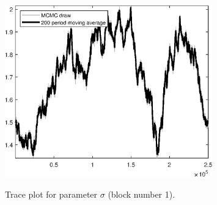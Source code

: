 \begin{figure}[H]
\centering
  \includegraphics[width=0.8\textwidth]{BRS_aggregate/graphs/TracePlot_sigma_blck_1}\\
    \caption{Trace plot for parameter ${\sigma}$ (block number 1).}
\end{figure}
